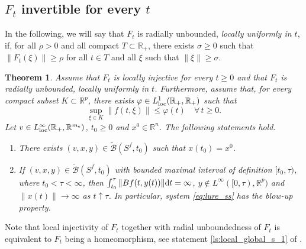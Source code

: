 \documentclass[a4paper,11pt]{article}
\newcommand{\R}{\mathbb R}
\newcommand{\sB}{{\mathcal B}}
\numberwithin{equation}{section}
\numberwithin{figure}{section}
\numberwithin{table}{section}
\newtheorem{theorem}{Theorem}[section]
\begin{document}
\subsection{$F_t$ invertible for every $t$}\label{subsec:invertible}
%
In the following, we will say that $F_t$ is radially unbounded, {\it locally uniformly in $t$}, if, for all $\rho>0$ and all compact $T\subset\R_+$, there exists $\sigma\geq 0$ such that $\|F_t(\xi)\|\geq\rho$ for all $t\in T$ and all $\xi$ such that $\|\xi\|\geq\sigma$.
%
\begin{theorem}\label{thm:single_valued}
Assume that $F_t$ is locally injective for every $t\geq 0$ and that
$F_t$ is radially unbounded, locally uniformly in $t$. Furthermore,
assume that, for every compact subset $K\subset\R^p$, there exists
$\varphi\in L^1_{\rm loc}(\R_+,\R_+)$ such that
\begin{equation}\label{eq:single_valued}
\sup_{\xi\in K}\|f(t,\xi)\|\leq\varphi(t)\quad\forall\,t\geq 0.
\end{equation}
Let $v\in L^\infty_{\rm loc}(\R_+,\R^{m_{\rm e}})$, $t_0\geq 0$ and $x^0\in\R^n$. The following statements hold.
%
\begin{enumerate}[label = {\bf (\arabic*)}, ref={\rm (\arabic*)}, leftmargin = 0ex, itemindent = 4.6ex]
\item\label{ls:single_valued_s_1}
There exists $(v,x,y)\in\tilde\sB(S^f,t_0)$ such that $x(t_0)=x^0$.
%
\item\label{ls:single_valued_s_2}
If $(v,x,y)\in\tilde\sB(S^f,t_0)$ with bounded maximal interval of definition $[t_0,\tau)$,
where $t_0<\tau<\infty$, then $\int_{t_0}^\tau\|Bf(t,y(t))\|{\rm d}t=\infty$, $y\not\in L^\infty([0,\tau),\R^p)$ and $\|x(t)\|\to\infty$ as $t\uparrow\tau$. In particular,
system \eqref{eq:lure_ss} has the blow-up property.
%
\end{enumerate}
\end{theorem}
%
Note that local injectivity of $F_t$ together with radial unboundedness of $F_t$ is equivalent to
$F_t$ being a homeomorphism, see statement \ref{ls:local_global_s_1} of .
%
\end{document}
